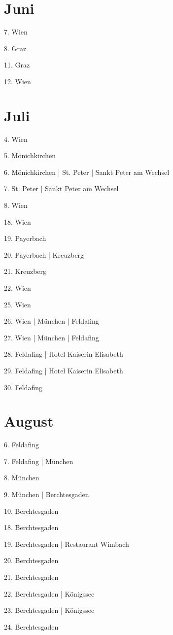 \documentclass[twoside=false,titlepage=false,open=any, parskip=never, fontsize=10pt, headings=small, chapterprefix=false, appendixprefix=false, DIV=15]{scrbook}
\begin{document}
\begin{multicols}{3}
            \section*{Juni}
            7. Wien\par
            8. Graz\par
            11. Graz\par
            12. Wien\par
            \section*{Juli}
            4. Wien\par
            5. Mönichkirchen\par
            6. Mönichkirchen | St. Peter | Sankt Peter am Wechsel\par
            7. St. Peter | Sankt Peter am Wechsel\par
            8. Wien\par
            18. Wien\par
            19. Payerbach\par
            20. Payerbach | Kreuzberg\par
            21. Kreuzberg\par
            22. Wien\par
            25. Wien\par
            26. Wien | München | Feldafing\par
            27. Wien | München | Feldafing\par
            28. Feldafing | Hotel Kaiserin Elisabeth\par
            29. Feldafing | Hotel Kaiserin Elisabeth\par
            30. Feldafing\par
            \section*{August}
            6. Feldafing\par
            7. Feldafing | München\par
            8. München\par
            9. München | Berchtesgaden\par
            10. Berchtesgaden\par
            18. Berchtesgaden\par
            19. Berchtesgaden | Restaurant Wimbach\par
            20. Berchtesgaden\par
            21. Berchtesgaden\par
            22. Berchtesgaden | Königssee\par
            23. Berchtesgaden | Königssee\par
            24. Berchtesgaden\par

\end{multicols}
\end{document}
